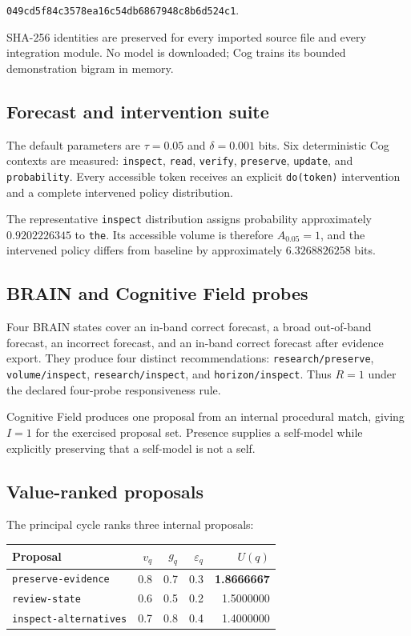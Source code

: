 \documentclass[11pt,a4paper]{article}
\begin{document}
\begin{center}
\texttt{049cd5f84c3578ea16c54db6867948c8b6d524c1}.
\end{center}

SHA-256 identities are preserved for every imported source file and every integration module. No model is downloaded; Cog trains its bounded demonstration bigram in memory.

\subsection{Forecast and intervention suite}
The default parameters are $\tau=0.05$ and $\delta=0.001$ bits. Six deterministic Cog contexts are measured: \texttt{inspect}, \texttt{read}, \texttt{verify}, \texttt{preserve}, \texttt{update}, and \texttt{probability}. Every accessible token receives an explicit \texttt{do(token)} intervention and a complete intervened policy distribution.

The representative \texttt{inspect} distribution assigns probability approximately $0.9202226345$ to \texttt{the}. Its accessible volume is therefore $A_{0.05}=1$, and the intervened policy differs from baseline by approximately $6.3268826258$ bits.

\subsection{BRAIN and Cognitive Field probes}
Four BRAIN states cover an in-band correct forecast, a broad out-of-band forecast, an incorrect forecast, and an in-band correct forecast after evidence export. They produce four distinct recommendations: \texttt{research/preserve}, \texttt{volume/inspect}, \texttt{research/inspect}, and \texttt{horizon/inspect}. Thus $R=1$ under the declared four-probe responsiveness rule.

Cognitive Field produces one proposal from an internal procedural match, giving $I=1$ for the exercised proposal set. Presence supplies a self-model while explicitly preserving that a self-model is not a self.

\subsection{Value-ranked proposals}
The principal cycle ranks three internal proposals:

\begin{center}
\begin{tabular}{lrrrr}
\toprule
Proposal & $v_q$ & $g_q$ & $\varepsilon_q$ & $U(q)$ \\
\midrule
\texttt{preserve-evidence} & 0.8 & 0.7 & 0.3 & \textbf{1.8666667} \\
\texttt{review-state} & 0.6 & 0.5 & 0.2 & 1.5000000 \\
\texttt{inspect-alternatives} & 0.7 & 0.8 & 0.4 & 1.4000000 \\
\bottomrule
\end{tabular}
\end{center}
\end{document}
